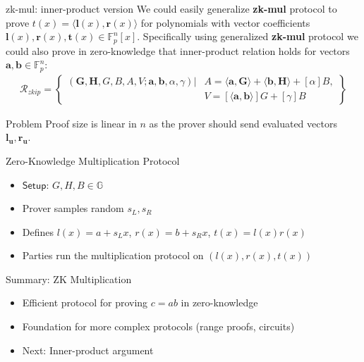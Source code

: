 \documentclass{zkdl-presentation-template}
\begin{document}
\begin{frame}{zk-mul: inner-product version}
    We could easily generalize \textbf{zk-mul} protocol to prove $t(x) = \langle \mathbf{l}(x), \mathbf{r}(x) \rangle $ for polynomials with vector coefficients $\mathbf{l}(x), \mathbf{r}(x), \mathbf{t}(x) \in \mathbb{F}_p^n[x]$. Specifically using generalized \textbf{zk-mul} protocol we could also prove in zero-knowledge that inner-product relation holds for vectors $\mathbf{a}, \mathbf{b} \in \mathbb{F}_p^n$:
    \begin{align*}
        \mathcal{R}_{zkip} = \left\{ \begin{aligned} (\mathbf{G,H},G,B,A,V;\mathbf{a,b},\alpha, \gamma) \vert & A = \langle \mathbf{a,G} \rangle + \langle \mathbf{b,H} \rangle + [\alpha] B, \\ & V = [\langle \mathbf{a,b} \rangle]G + [\gamma]B \end{aligned} \right\}
    \end{align*}
    \begin{alertblock}{Problem}
        Proof size is linear in $n$ as the prover should send evaluated vectors $\mathbf{l_u}, \mathbf{r_u}$.
    \end{alertblock}
\end{frame}

\begin{frame}{Zero-Knowledge Multiplication Protocol}
    \begin{itemize}
        \item $\mathsf{Setup}$: $G, H, B \in \mathbb{G}$
        \item Prover samples random $s_L, s_R$
        \item Defines $l(x) = a + s_L x$, $r(x) = b + s_R x$, $t(x) = l(x)r(x)$
        \item Parties run the multiplication protocol on $(l(x), r(x), t(x))$
    \end{itemize}
\end{frame}

\begin{frame}{Summary: ZK Multiplication}
    \begin{itemize}
        \item Efficient protocol for proving $c = ab$ in zero-knowledge
        \item Foundation for more complex protocols (range proofs, circuits)
        \item Next: Inner-product argument
    \end{itemize}
\end{frame}
\end{document}
